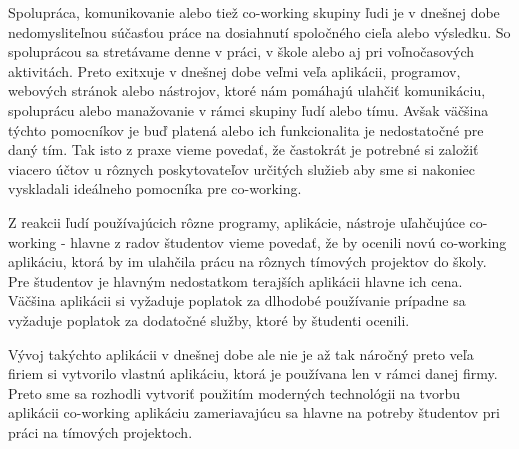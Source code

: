 \indent Spolupráca, komunikovanie alebo tiež co-working skupiny ľudi je v dnešnej dobe nedomysliteľnou súčasťou práce na dosiahnutí spoločného cieľa alebo výsledku. So spoluprácou sa stretávame denne v práci, v škole alebo aj pri voľnočasových aktivitách. Preto exitxuje v dnešnej dobe veľmi veľa aplikácii, programov, webových stránok alebo nástrojov, ktoré nám pomáhajú ulahčiť komunikáciu, spoluprácu alebo manažovanie v rámci skupiny ľudí alebo tímu. Avšak väčšina týchto pomocníkov je buď platená alebo ich funkcionalita je nedostatočné pre daný tím. Tak isto z praxe vieme povedať, že častokrát je potrebné si založiť viacero účtov u rôznych poskytovateľov určitých služieb aby sme si nakoniec vyskladali ideálneho pomocníka pre co-working.

\indent Z reakcii ľudí používajúcich rôzne programy, aplikácie, nástroje uľahčujúce co-working - hlavne z radov študentov vieme povedať, že by ocenili novú co-working aplikáciu, ktorá by im ulahčila prácu na rôznych tímových projektov do školy. Pre študentov je hlavným nedostatkom terajších aplikácii hlavne ich cena. Väčšina aplikácii si vyžaduje poplatok za dlhodobé používanie prípadne sa vyžaduje poplatok za dodatočné služby, ktoré by študenti ocenili. 

\indent Vývoj takýchto aplikácii v dnešnej dobe ale nie je až tak náročný preto veľa firiem si vytvorilo vlastnú aplikáciu, ktorá je používana len v rámci danej firmy. Preto sme sa rozhodli vytvoriť použitím moderných technológii na tvorbu aplikácii co-working aplikáciu zameriavajúcu sa hlavne na potreby študentov pri práci na tímových projektoch.  
